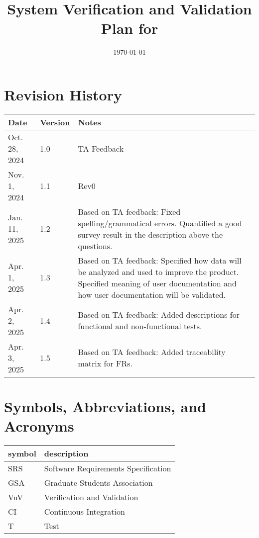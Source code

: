 \documentclass[12pt, titlepage]{article}
\begin{document}
\title{System Verification and Validation Plan for \progname{}} 
\author{\authname}
\date{\today}
	
\maketitle


\section*{Revision History}

\begin{tabularx}{\textwidth}{p{3cm}p{2cm}X}
\toprule {\bf Date} & {\bf Version} & {\bf Notes}\\
\midrule
Oct. 28, 2024 & 1.0 & TA Feedback\\
Nov. 1, 2024 & 1.1 & Rev0\\
Jan. 11, 2025 & 1.2 & Based on TA feedback: Fixed spelling/grammatical errors.
Quantified a good survey result in the description above the questions.\\
Apr. 1, 2025 & 1.3 & Based on TA feedback: Specified how data will be analyzed
and used to improve the product. Specified meaning of user documentation and
how user documentation will be validated.\\
Apr. 2, 2025 & 1.4 & Based on TA feedback: Added descriptions for functional
and non-functional tests.\\
Apr. 3, 2025 & 1.5 & Based on TA feedback: Added traceability matrix for FRs.\\
\bottomrule
\end{tabularx}

\newpage

\tableofcontents

\newpage

\section{Symbols, Abbreviations, and Acronyms}

\renewcommand{\arraystretch}{1.2}
\begin{tabular}{l l} 
  \toprule		
  \textbf{symbol} & \textbf{description}\\
  \midrule 
  SRS & Software Requirements Specification\\
  GSA & Graduate Students Association\\
  VnV & Verification and Validation\\
  CI & Continuous Integration\\
  T & Test\\
  \bottomrule
\end{tabular}\\
\end{document}
